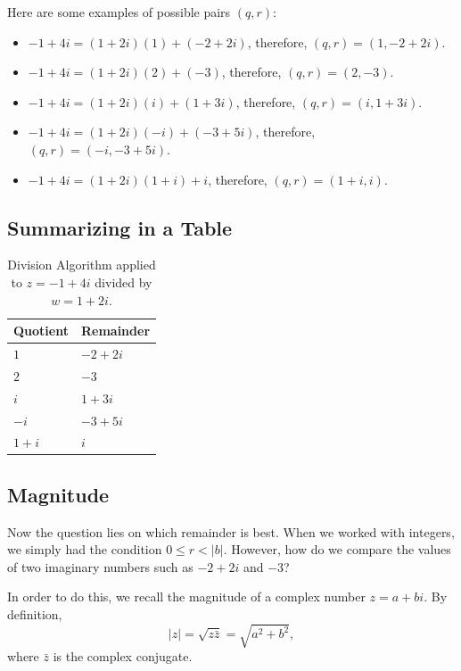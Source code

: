 \clearpage

Here are some examples of possible pairs $(q,r)$:

\begin{itemize}
	\item $-1+4i=(1+2i)(1)+(-2+2i)$, therefore, $(q,r)=(1, -2+2i)$.
	\item $-1+4i=(1+2i)(2)+(-3)$, therefore, $(q,r)=(2, -3)$.
	\item $-1+4i=(1+2i)(i)+(1+3i)$, therefore, $(q,r)=(i, 1+3i)$.
	\item $-1+4i=(1+2i)(-i)+(-3+5i)$, therefore, $(q,r)=(-i, -3+5i)$.
	\item $-1+4i=(1+2i)(1+i)+i$, therefore, $(q,r)=(1+i, i)$.
\end{itemize}

\clearpage

\subsection*{Summarizing in a Table}

\begin{table}[h] 
	\centering
	\begin{tabular}{l l}
		\toprule
		Quotient & Remainder \\
		\midrule
		$1$ & $-2+2i$ \\
		$2$ & $-3$ \\ 
		$i$ & $1+3i$ \\
		$-i$ & $-3+5i$ \\
		$1+i$ & $i$ \\ 
		\bottomrule
		
	\end{tabular}
	
	\caption{Division Algorithm applied to $z=-1+4i$ divided by $w=1+2i$.}
	\label{tab:div}
\end{table}

\subsection*{Magnitude} 

Now the question lies on which remainder is best. When we worked with integers, we simply had the condition $0\le r<|b|$. However, how do we compare the values of two imaginary numbers such as $-2+2i$ and $-3$?  

In order to do this, we recall the magnitude of a complex number $z=a+bi$. By definition, $$|z|=\sqrt{z\bar{z}}=\sqrt{a^2+b^2},$$ where $\bar{z}$ is the complex conjugate.  

